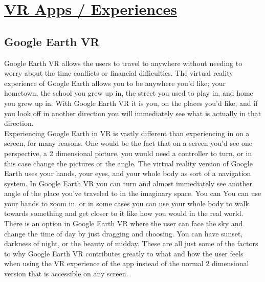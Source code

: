 \documentclass{article}
\begin{document}
 
\section*{\underline{VR Apps / Experiences}}

\subsection*{Google Earth VR}
Google Earth VR allows the users to travel to anywhere without needing to worry about the time conflicts or financial difficulties.  The virtual reality experience of Google Earth allows you to be anywhere you'd like; your hometown, the school you grew up in, the street you used to play in, and home you grew up in. With Google Earth VR it is you, on the places you'd like, and if you look off in another direction you will immediately see what is actually in that direction. \\
Experiencing Google Earth in VR is vastly different than experiencing in on a screen, for many reasons. One would be the fact that on a screen you'd see one perspective, a 2 dimensional picture, you would need a controller to turn, or in this case change the pictures or the angle. The virtual reality version of Google Earth uses your hands, your eyes, and your whole body as sort of a navigation system. In Google Earth VR you can turn and almost immediately see another angle of the place you've traveled to in the imaginary space. You can You can use your hands to zoom in, or in some cases you can use your whole body to walk towards something and get closer to it like how you would in the real world.\\
There is an option in Google Earth VR where the user can face the sky and change the time of day by just dragging and choosing. You can have sunset, darkness of night, or the beauty of midday. These are all just some of the factors to why Google Earth VR contributes greatly to what and how the user feels when using the VR experience of the app instead of the normal 2 dimensional version that is accessible on any screen. 
\end{document}

